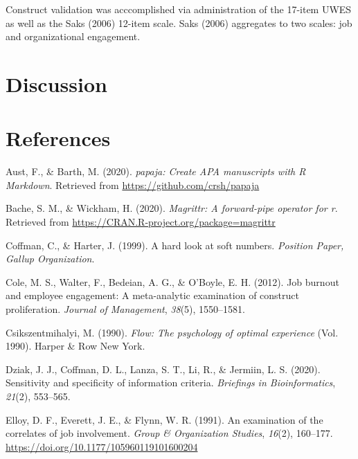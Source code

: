 \documentclass[
  english,
  man]{apa6}
\begin{document}
Construct validation was acccomplished via administration of the 17-item UWES as well as the Saks (2006) 12-item scale. Saks (2006) aggregates to two scales: job and organizational engagement.

\hypertarget{discussion}{%
\section{Discussion}\label{discussion}}

\newpage

\hypertarget{references}{%
\section{References}\label{references}}

\begingroup
\setlength{\parindent}{-0.5in}
\setlength{\leftskip}{0.5in}

\hypertarget{refs}{}
\leavevmode\hypertarget{ref-R-papaja}{}%
Aust, F., \& Barth, M. (2020). \emph{papaja: Create APA manuscripts with R Markdown}. Retrieved from \url{https://github.com/crsh/papaja}

\leavevmode\hypertarget{ref-R-magrittr}{}%
Bache, S. M., \& Wickham, H. (2020). \emph{Magrittr: A forward-pipe operator for r}. Retrieved from \url{https://CRAN.R-project.org/package=magrittr}

\leavevmode\hypertarget{ref-coffman_hard_1999}{}%
Coffman, C., \& Harter, J. (1999). A hard look at soft numbers. \emph{Position Paper, Gallup Organization}.

\leavevmode\hypertarget{ref-cole2012job}{}%
Cole, M. S., Walter, F., Bedeian, A. G., \& O'Boyle, E. H. (2012). Job burnout and employee engagement: A meta-analytic examination of construct proliferation. \emph{Journal of Management}, \emph{38}(5), 1550--1581.

\leavevmode\hypertarget{ref-csikszentmihalyi1990flow}{}%
Csikszentmihalyi, M. (1990). \emph{Flow: The psychology of optimal experience} (Vol. 1990). Harper \& Row New York.

\leavevmode\hypertarget{ref-dziak2020sensitivity}{}%
Dziak, J. J., Coffman, D. L., Lanza, S. T., Li, R., \& Jermiin, L. S. (2020). Sensitivity and specificity of information criteria. \emph{Briefings in Bioinformatics}, \emph{21}(2), 553--565.

\leavevmode\hypertarget{ref-elloy_examination_1991}{}%
Elloy, D. F., Everett, J. E., \& Flynn, W. R. (1991). An examination of the correlates of job involvement. \emph{Group \& Organization Studies}, \emph{16}(2), 160--177. \url{https://doi.org/10.1177/105960119101600204}
\end{document}
